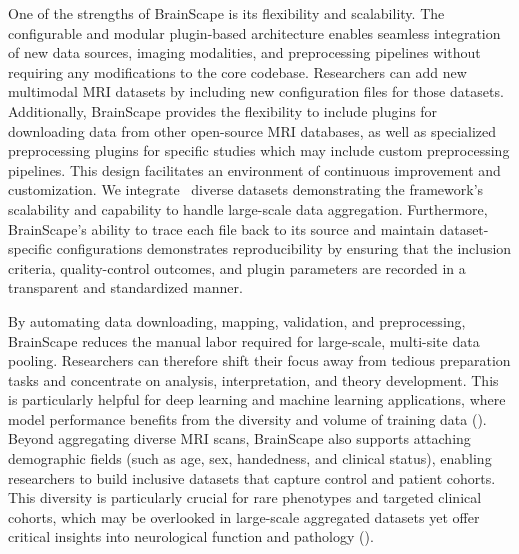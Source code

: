One of the strengths of BrainScape is its flexibility and scalability. 
The configurable and modular plugin-based architecture enables 
seamless integration of new data sources, imaging modalities, and preprocessing pipelines without requiring any modifications to the core codebase.
Researchers can add new multimodal MRI datasets by including new configuration files for those datasets.
Additionally, BrainScape provides the flexibility to include plugins for downloading data from other open-source MRI databases, 
as well as specialized preprocessing plugins for specific studies which may include custom preprocessing pipelines.
This design facilitates an environment of continuous improvement and customization.
We integrate \NumDatasets\ diverse datasets demonstrating the framework's scalability 
and capability to handle large-scale data aggregation.
Furthermore, BrainScape's ability to trace each file back to its source and maintain 
dataset-specific configurations demonstrates reproducibility by ensuring that the inclusion criteria, 
quality-control outcomes, and plugin parameters are recorded in a transparent and standardized manner.

By automating data downloading, mapping, validation, and preprocessing, BrainScape reduces the 
manual labor required for large-scale, multi-site data pooling. Researchers can therefore shift 
their focus away from tedious preparation tasks and concentrate on analysis, interpretation, and theory development. 
This is particularly helpful for deep learning and machine learning applications, where model 
performance benefits from the diversity and volume of training data (\cite{dishner2024survey}). Beyond aggregating diverse MRI scans, 
BrainScape also supports attaching demographic fields (such as age, sex, handedness, and clinical status), enabling 
researchers to build inclusive datasets that capture control and patient cohorts. 
This diversity is particularly crucial for rare phenotypes and targeted clinical cohorts, 
which may be overlooked in large-scale aggregated datasets yet offer critical insights into neurological function and pathology (\cite{thompson2014enigma}).

